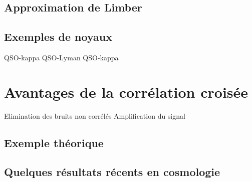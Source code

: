 \subsection{Approximation de Limber}
\subsection{Exemples de noyaux}
QSO-kappa
QSO-Lyman
QSO-kappa

\section{Avantages de la corrélation croisée}
Elimination des bruits non corrélés
Amplification du signal
\subsection{Exemple théorique}
\subsection{Quelques résultats récents en cosmologie}